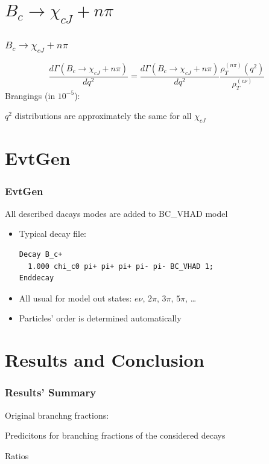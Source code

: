 \documentclass{beamer}
\begin{document}
\section{$B_c\to \chi_{cJ}+n\pi$}
\begin{frame}
  \frametitle{$B_c\to \chi_{cJ}+n\pi$}
  $$
  \frac{d\Gamma\left(B_c \to \chi_{cJ} + n\pi\right)}{dq^2} = \frac{d\Gamma\left(B_c \to \chi_{cJ} + n\pi\right)}{dq^2} \frac{\rho_T^{(n\pi)}(q^2)}{\rho_T^{(e\nu)}}
  $$
  Brangings (in $10^{-5}$):
  {\small
    
    }
  $q^2$ distributions are approximately the same for all $\chi_{cJ}$
\end{frame}

\section{EvtGen}
\begin{frame}[fragile]
  \frametitle{EvtGen}
  All described dacays modes are added to BC\_VHAD model
  \begin{itemize}
  \item   Typical decay file:
    \begin{block}{}
\begin{verbatim}
Decay B_c+
  1.000 chi_c0 pi+ pi+ pi+ pi- pi- BC_VHAD 1;
Enddecay
\end{verbatim}
    \end{block}
\item All usual for model out states: $e\nu$, $2\pi$, $3\pi$, $5\pi$, \dots 
\item Particles' order is determined automatically 
\end{itemize}


\end{frame}


\section{Results and Conclusion}
\begin{frame}
  \frametitle{Results' Summary}
  Original branchng fractions:
  {\tiny}
  
  Predicitons for branching fractions of the considered decays
  {\tiny}

  Ratios
  {\tiny}
  
\end{frame}
\end{document}
